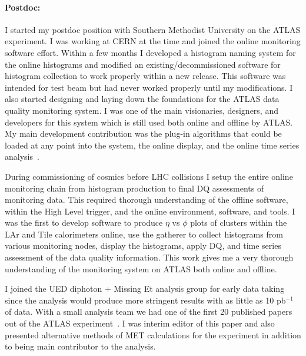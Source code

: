 \documentclass[11pt]{article}
\begin{document}
\paragraph{Postdoc:}I started my postdoc position with Southern Methodist University on the ATLAS experiment.  I was working at CERN at the time and joined the online monitoring software effort. Within a few months I developed a histogram
naming system for the online histograms and modified an existing/decommissioned software for histogram collection to work properly within a new release.  This software was intended for test beam but had never worked properly 
until my modifications.  I also started designing and laying down the foundations for the ATLAS data quality monitoring system.  I was one of the main visionaries, designers, and developers for this system
which is still used both online and offline by ATLAS. My main development contribution was the plug-in algorithms that could be loaded at any point into the system, the online display, and the online time series analysis~\cite{atl5b,atl6}.

During commissioning of cosmics before LHC collisions I setup the entire online monitoring chain from histogram production to final DQ assessments of monitoring data.  This required thorough understanding
of the offline software, within the High Level trigger, and the online environment, software, and tools.  I was the first to develop software to produce $\eta$ vs $\phi$ plots of clusters within the LAr and Tile calorimeters online, use the gatherer to
collect histograms from various monitoring nodes, display the histograms, apply DQ, and time series assessment of the data quality information.  This work gives me a very thorough understanding of the monitoring system on ATLAS both online and offline.

I joined the UED diphoton + Missing Et analysis group for early data taking since the analysis would produce more stringent results with as little as 10 pb$^{-1}$ of data.  With a small analysis team we had one of the first 20 published papers
out of the ATLAS experiment~\cite{atl2}. I was interim editor of this paper and also presented alternative methods of MET calculations for the experiment in addition to being main contributor to the analysis. 
\end{document}
